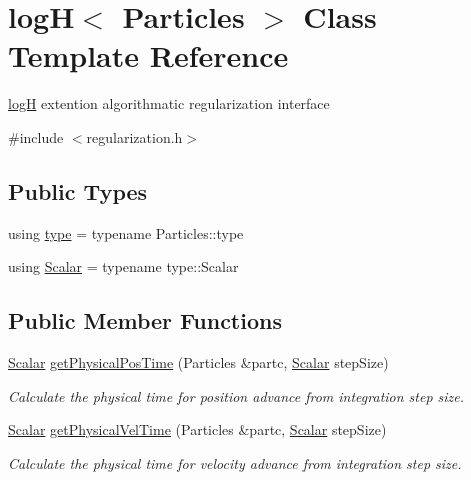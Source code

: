 \hypertarget{classlog_h}{}\section{logH$<$ Particles $>$ Class Template Reference}
\label{classlog_h}


\mbox{\hyperlink{classlog_h}{logH}} extention algorithmatic regularization interface  




{\ttfamily \#include $<$regularization.\+h$>$}

\subsection*{Public Types}
\begin{DoxyCompactItemize}
\item 
using \mbox{\hyperlink{classlog_h_aa902eaf1133d9ef2cd15713d81619240}{type}} = typename Particles\+::type
\item 
using \mbox{\hyperlink{classlog_h_a2235c75eff5d2e299c8ce4b2c02f8801}{Scalar}} = typename type\+::\+Scalar
\end{DoxyCompactItemize}
\subsection*{Public Member Functions}
\begin{DoxyCompactItemize}
\item 
\mbox{\hyperlink{classlog_h_a2235c75eff5d2e299c8ce4b2c02f8801}{Scalar}} \mbox{\hyperlink{classlog_h_a000fc113a586407aa8dd8fbac34b614a}{get\+Physical\+Pos\+Time}} (Particles \&partc, \mbox{\hyperlink{classlog_h_a2235c75eff5d2e299c8ce4b2c02f8801}{Scalar}} step\+Size)
\begin{DoxyCompactList}\small\item\em Calculate the physical time for position advance from integration step size. \end{DoxyCompactList}\item 
\mbox{\hyperlink{classlog_h_a2235c75eff5d2e299c8ce4b2c02f8801}{Scalar}} \mbox{\hyperlink{classlog_h_a36f5b226fde188b50bf9df1451c75199}{get\+Physical\+Vel\+Time}} (Particles \&partc, \mbox{\hyperlink{classlog_h_a2235c75eff5d2e299c8ce4b2c02f8801}{Scalar}} step\+Size)
\begin{DoxyCompactList}\small\item\em Calculate the physical time for velocity advance from integration step size. \end{DoxyCompactList}\end{DoxyCompactItemize}


